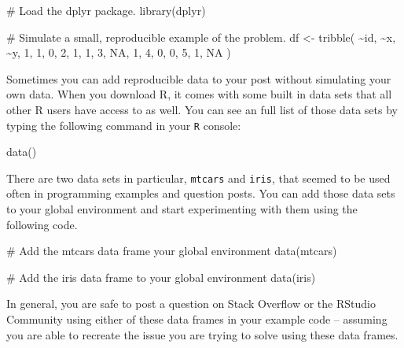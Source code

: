 \documentclass[
  letterpaper,
  DIV=11,
  numbers=noendperiod]{scrreprt}
\newenvironment{Shaded}{\begin{snugshade}}{\end{snugshade}}
\newcommand{\CommentTok}[1]{\textcolor[rgb]{0.37,0.37,0.37}{#1}}
\newcommand{\ConstantTok}[1]{\textcolor[rgb]{0.56,0.35,0.01}{#1}}
\newcommand{\DecValTok}[1]{\textcolor[rgb]{0.68,0.00,0.00}{#1}}
\newcommand{\FunctionTok}[1]{\textcolor[rgb]{0.28,0.35,0.67}{#1}}
\newcommand{\NormalTok}[1]{\textcolor[rgb]{0.00,0.23,0.31}{#1}}
\newcommand{\OtherTok}[1]{\textcolor[rgb]{0.00,0.23,0.31}{#1}}
\newcommand{\SpecialCharTok}[1]{\textcolor[rgb]{0.37,0.37,0.37}{#1}}
\begin{document}
\begin{Shaded}
\begin{Highlighting}[]
\CommentTok{\# Load the dplyr package.}
\FunctionTok{library}\NormalTok{(dplyr)}

\CommentTok{\# Simulate a small, reproducible example of the problem.}
\NormalTok{df }\OtherTok{\textless{}{-}} \FunctionTok{tribble}\NormalTok{(}
  \SpecialCharTok{\textasciitilde{}}\NormalTok{id, }\SpecialCharTok{\textasciitilde{}}\NormalTok{x, }\SpecialCharTok{\textasciitilde{}}\NormalTok{y,}
  \DecValTok{1}\NormalTok{, }\DecValTok{1}\NormalTok{, }\DecValTok{0}\NormalTok{,}
  \DecValTok{2}\NormalTok{, }\DecValTok{1}\NormalTok{, }\DecValTok{1}\NormalTok{,}
  \DecValTok{3}\NormalTok{, }\ConstantTok{NA}\NormalTok{, }\DecValTok{1}\NormalTok{,}
  \DecValTok{4}\NormalTok{, }\DecValTok{0}\NormalTok{, }\DecValTok{0}\NormalTok{,}
  \DecValTok{5}\NormalTok{, }\DecValTok{1}\NormalTok{, }\ConstantTok{NA}
\NormalTok{)}
\end{Highlighting}
\end{Shaded}

Sometimes you can add reproducible data to your post without simulating
your own data. When you download R, it comes with some built in data
sets that all other R users have access to as well. You can see an full
list of those data sets by typing the following command in your
\texttt{R} console:

\begin{Shaded}
\begin{Highlighting}[]
\FunctionTok{data}\NormalTok{()}
\end{Highlighting}
\end{Shaded}

There are two data sets in particular, \texttt{mtcars} and
\texttt{iris}, that seemed to be used often in programming examples and
question posts. You can add those data sets to your global environment
and start experimenting with them using the following code.

\begin{Shaded}
\begin{Highlighting}[]
\CommentTok{\# Add the mtcars data frame your global environment}
\FunctionTok{data}\NormalTok{(mtcars)}

\CommentTok{\# Add the iris data frame to your global environment}
\FunctionTok{data}\NormalTok{(iris)}
\end{Highlighting}
\end{Shaded}

In general, you are safe to post a question on Stack Overflow or the
RStudio Community using either of these data frames in your example code
-- assuming you are able to recreate the issue you are trying to solve
using these data frames.
\end{document}
